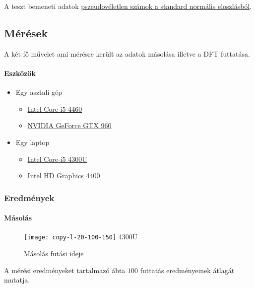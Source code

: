 A teszt bemeneti adatok \href{https://en.cppreference.com/w/cpp/numeric/random/normal_distribution}{pszeudov\'eletlen sz\'amok a standard norm\'alis eloszl\'asb\'ol}.

\subsection{M\'er\'esek}
A k\'et f\H o m\H uvelet ami m\'er\'esre ker\"ult az adatok m\'asol\'asa illetve a DFT futtat\'asa.

\paragraph{Eszk\"oz\"ok}
\begin{itemize}
	\item Egy asztali g\'ep
	\begin{itemize}
		\item \href{https://ark.intel.com/products/80817/Intel-Core-i5-4460-Processor-6M-Cache-up-to-3_40-GHz}
		{Intel Core-i5 4460}
		\item \href{https://www.geforce.com/hardware/desktop-gpus/geforce-gtx-960}
		{NVIDIA GeForce GTX 960}
	\end{itemize}
	\item Egy laptop
	\begin{itemize}
		\item \href{https://ark.intel.com/products/76308/Intel-Core-i5-4300U-Processor-3M-Cache-up-to-2_90-GHz}
		{Intel Core-i5 4300U}
		\item Intel HD Graphics 4400
	\end{itemize}
\end{itemize}

\subsubsection{Eredm\'enyek}



\paragraph{M\'asol\'as}

\begin{figure}[h]
	\texttt{[image: copy-l-20-100-150]}
	{4300U}
	\centering
	\caption{M\'asol\'as fut\'asi ideje}
\end{figure}

A m\'er\'esi eredm\'enyeket tartalmaz\'o \'abta $100$ futtat\'as eredm\'enyeinek \'atlag\'at mutatja.

